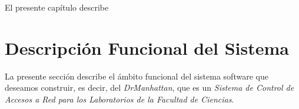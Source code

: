﻿%


\label{chap:planificacion}


El presente cap\'itulo describe 

\chaptertoc

\section{Descripción Funcional del Sistema}
\label{sec:planificacion:descFuncional}

La presente sección describe el ámbito funcional del sistema software que deseamos construir, es decir, del \emph{DrManhattan}, que es un \emph{Sistema de Control de Accesos a Red para los Laboratorios de la Facultad de Ciencias}.


